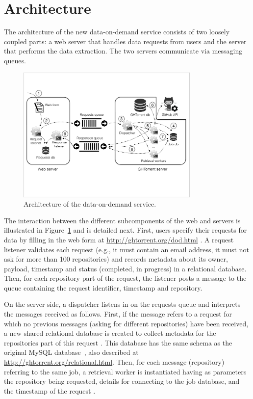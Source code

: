 
\section{Architecture}
\label{sec:arch}

The architecture of the new \ght data-on-demand service consists of two loosely coupled parts:
a web server that handles data requests from users and the \ght server that performs the data extraction.
The two servers communicate via messaging queues.

\begin{figure}[t]
\begin{center}
\includegraphics[width=0.8\textwidth, trim=5 160 5 105, clip=True]{figures/architecture.pdf}
\caption{Architecture of the \ght data-on-demand service.}
\label{fig:architecture}
\end{center}
\end{figure}

The interaction between the different subcomponents of the web and \ght servers is illustrated in
Figure~\ref{fig:architecture} and is detailed next.
First, users specify their requests for data by filling in the web form at \url{http://ghtorrent.org/dod.html} .
A request listener validates each request (e.g., it must contain an email address, it must not ask for
more than 100 repositories)
and records metadata about its owner, payload, timestamp and status (completed, in progress) in 
a relational database.
Then, for each \gh repository part of the request, the listener posts a message to the queue 
containing the request identifier, timestamp and repository. 

On the \ght server side, a dispatcher listens in on the requests queue  and interprets the 
messages received as follows.
First, if the message refers to a request for which no previous messages (asking for different repositories) 
have been received, a new shared relational database is created to collect metadata for the repositories part
of this request . 
This database has the same schema as the original \ght MySQL database~\cite{gousios2013ghtorent},
also described at \url{http://ghtorrent.org/relational.html}.
Then, for each message (repository) referring to the same job, a retrieval worker is instantiated having
as parameters the repository being requested, details for connecting to the job database, and the
timestamp of the request .

